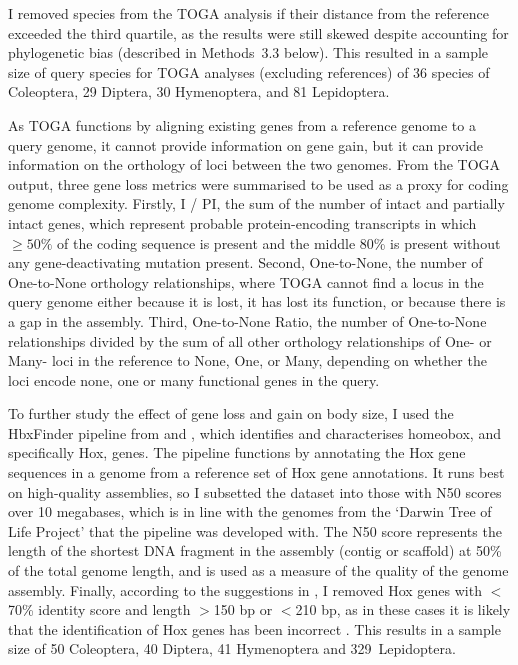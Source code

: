 \documentclass[11pt]{article}
\begin{document}
I removed species from the TOGA analysis if their distance from the reference exceeded the third quartile, as the results were still skewed despite accounting for phylogenetic bias (described in Methods~3.3 below). This resulted in a sample size of query species for TOGA analyses (excluding references) of 36 species of Coleoptera,  29 Diptera, 30 Hymenoptera, and 81 Lepidoptera.

As TOGA functions by aligning existing genes from a reference genome to a query genome, it cannot provide information on gene gain, but it can provide information on the orthology of loci between the two genomes. From the TOGA output, three gene loss metrics were summarised to be used as a proxy for coding genome complexity. Firstly, I / PI, the sum of the number of intact and partially intact genes, which represent probable protein-encoding transcripts in which $\geq50\%$ of the coding sequence is present and the middle 80\% is present without any gene-deactivating mutation present. Second, One-to-None, the number of One-to-None orthology relationships, where TOGA cannot find a locus in the query genome either because it is lost, it has lost its function, or because there is a gap in the assembly. Third, One-to-None Ratio, the number of One-to-None relationships divided by the sum of all other orthology relationships of One- or Many- loci in the reference to None, One, or Many, depending on whether the loci encode none, one or many functional genes in the query.

To further study the effect of gene loss and gain on body size, I used the HbxFinder pipeline from \cite{hbxfinder1} and \cite{hbxfinder2}, which identifies and characterises homeobox, and specifically Hox, genes. The pipeline functions by annotating the Hox gene sequences in a genome from a reference set of Hox gene annotations. It runs best on high-quality assemblies, so I subsetted the dataset into those with N50 scores over 10 megabases, which is in line with the genomes from the `Darwin Tree of Life Project' that the pipeline was developed with. The N50 score represents the length of the shortest DNA fragment in the assembly (contig or scaffold) at 50\% of the total genome length, and is used as a measure of the quality of the genome assembly. Finally, according to the suggestions in \cite{hbxfinder2}, I removed Hox genes with $<$70\% identity score and length $>$150 bp or $<$210 bp, as in these cases it is likely that the identification of Hox genes has been incorrect \citep{hox-length}. This results in a sample size of 50 Coleoptera, 40 Diptera, 41 Hymenoptera and 329~Lepidoptera.
\end{document}
